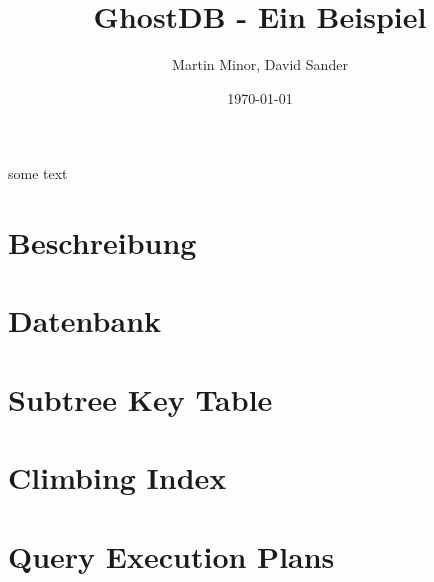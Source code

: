 \documentclass[a4paper, pdftex, notitlepage, parskip]{scrreprt}
\begin{document}
\title{\vspace{2cm} \Huge GhostDB - Ein Beispiel \vspace{2cm}}
\author{Martin Minor, David Sander}
\date{\today}
\maketitle
\vspace{2cm}
%
some text 
%
\chapter{Beschreibung}


\tableofcontents
\listoffigures
\listoftables
\pagestyle{headings}
%
\chapter{Datenbank}

\chapter{Subtree Key Table}

\chapter{Climbing Index}

\chapter{Query Execution Plans}

%
\end{document}
